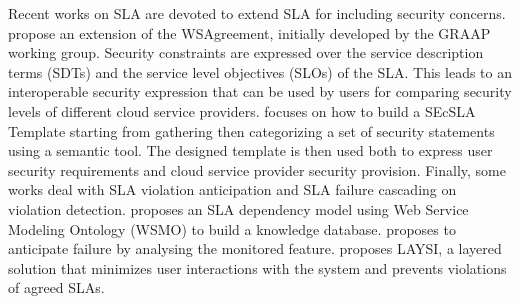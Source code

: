 
Recent  works on SLA are devoted to extend  SLA for including  security concerns. 
\cite{6274042} propose an extension of the WSAgreement, initially developed by the GRAAP
working group. 
Security constraints are expressed over the service description
terms (SDTs) and the service level objectives (SLOs) of the SLA. 
This leads to an interoperable security expression that can be used by users for comparing security levels of different cloud service providers. 
\cite{LunaGarcia:2012:BCS:2381913.2381932} focuses on how to build a SEcSLA Template starting from gathering then categorizing a set of security statements using a semantic tool. 
The designed template is then used both to express user security requirements and cloud service provider security provision.
Finally, some works  deal with SLA violation anticipation and SLA failure cascading on violation detection.  \cite{Dastjerdi:2012:DOA:2275356.2275360}  proposes an SLA dependency model using Web Service Modeling Ontology (WSMO) to build a knowledge database. \cite{5614035} proposes to anticipate failure by analysing the monitored feature. 
\cite{5614035} proposes LAYSI, a layered solution that minimizes user interactions with the system and prevents violations of agreed SLAs.



